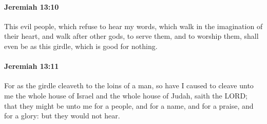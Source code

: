 		\paragraph{Jeremiah 13:10} %
			\label{JEREMIAH-13-10}

			This evil people, which refuse to hear my words, which walk in the imagination of their heart, and walk after other gods, to serve them, and to worship them, shall even be as this girdle, which is good for nothing.


		\paragraph{Jeremiah 13:11} %
			\label{JEREMIAH-13-11}

			For as the girdle cleaveth to the loins of a man, so have I caused to cleave unto me the whole house of Israel and the whole house of Judah, saith the LORD; that they might be unto me for a people, and for a name, and for a praise, and for a glory: but they would not hear.

